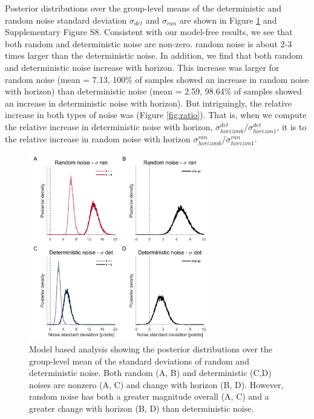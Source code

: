 \documentclass[12pt]{article}
\begin{document}
	Posterior distributions over the group-level means of the deterministic and random noise standard deviation $\sigma_{det}$ and $\sigma_{ran}$ are shown in Figure \ref{fig:mb1} and Supplementary Figure S8. Consistent with our model-free results, we see that both random and deterministic noise are non-zero.  random noise is about 2-3 times larger than the deterministic noise.  In addition, we find that both random and deterministic noise increase with horizon. This increase was larger for random noise (mean = 7.13, 100\% of samples showed an increase in random noise with horizon) than deterministic noise (mean = 2.59, 98.64\% of samples showed an increase in deterministic noise with horizon). But intriguingly, the relative increase in both types of noise was  (Figure \ref{fig:ratio}). That is, when we compute the relative increase in deterministic noise with horizon, $\sigma^{det}_{horizon6}/\sigma^{det}_{horizon1}$, it is  to the relative increase in random noise with horizon $\sigma^{ran}_{horizon6}/\sigma^{ran}_{horizon1}$. 
	
	\begin{figure}[H]
		\begin{center}
			\includegraphics[width=0.7\textwidth]{figures/RDBayes_hyperprior.jpg}
			\caption{Model based analysis showing the posterior distributions over the group-level mean of the standard deviations of  random and deterministic noise. Both random (A, B) and deterministic (C,D) noises are nonzero (A, C) and change with horizon (B, D).  However, random noise has both a greater magnitude overall (A, C) and a greater change with horizon (B, D) than deterministic noise.}
			\label{fig:mb1}
		\end{center}
	\end{figure}
	
\end{document}
